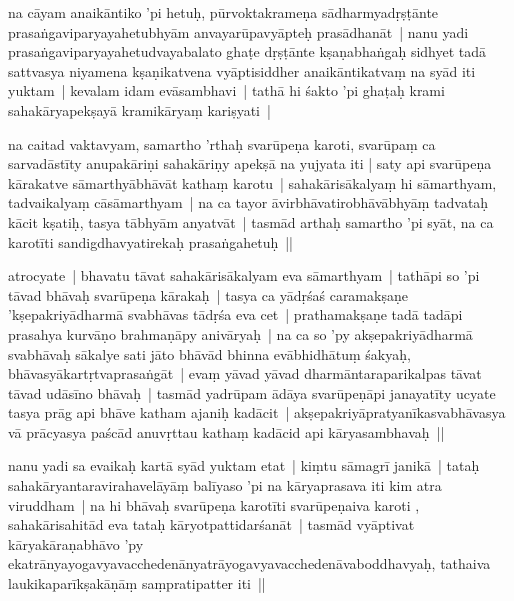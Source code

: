 \documentclass[article,12pt,a4paper]{memoir}%
\newcounter{parCount}
\begin{document}
	  \pstart \leavevmode%
	\label{thakur75-74.16}na cāyam anaikāntiko 'pi hetuḥ, pūrvoktakrameṇa sādharmyadṛṣṭānte prasaṅgaviparyayahetubhyām anvayarūpavyāpteḥ prasādhanāt |\label{thakur75-74.17} nanu yadi prasaṅgaviparyayahetudvayabalato ghaṭe dṛṣṭānte kṣaṇabhaṅgaḥ sidhyet tadā sattvasya niyamena kṣaṇikatvena vyāptisiddher anaikāntikatvaṃ na syād iti yuktam | kevalam idam evāsambhavi | tathā hi śakto 'pi ghaṭaḥ krami sahakāryapekṣayā kramikāryaṃ kariṣyati |
	{}
	\pend%
      

	  \pstart \leavevmode%
	\label{thakur75-74.21}na caitad vaktavyam, samartho 'rthaḥ svarūpeṇa karoti, svarūpaṃ ca sarvadāstīty anupakāriṇi sahakāriṇy apekṣā na yujyata iti | saty api svarūpeṇa kārakatve sāmarthyābhāvāt kathaṃ karotu | sahakārisākalyaṃ hi sāmarthyam, tadvaikalyaṃ cāsāmarthyam | na ca tayor āvirbhāvatirobhāvābhyāṃ tadvataḥ kācit kṣatiḥ, tasya tābhyām anyatvāt | tasmād arthaḥ samartho 'pi syāt, na ca karotīti sandigdhavyatirekaḥ prasaṅgahetuḥ ||
	{}
	\pend%
      

	  \pstart \leavevmode%
	\label{thakur75-74.27}atrocyate | bhavatu tāvat sahakārisākalyam eva sāmarthyam | tathāpi so 'pi tāvad bhāvaḥ svarūpeṇa kārakaḥ |\label{thakur75-74.28} tasya ca yādṛśaś caramakṣaṇe 'kṣepakriyādharmā svabhāvas tādṛśa eva cet | \label{thakur75-74.29} prathamakṣaṇe tadā tadāpi prasahya kurvāṇo brahmaṇāpy anivāryaḥ | na ca so 'py akṣepakriyādharmā svabhāvaḥ sākalye sati jāto bhāvād bhinna evābhidhātuṃ śakyaḥ, bhāvasyākartṛtvaprasaṅgāt | evaṃ yāvad yāvad dharmāntaraparikalpas tāvat tāvad udāsīno bhāvaḥ | \label{thakur75-75.2} tasmād yadrūpam ādāya svarūpeṇāpi janayatīty ucyate tasya prāg api bhāve katham ajaniḥ kadācit | akṣepakriyāpratyanīkasvabhāvasya vā prācyasya paścād anuvṛttau kathaṃ kadācid api kāryasambhavaḥ ||
	{}
	\pend%
      

	  \pstart \leavevmode%
	\label{thakur75-75.5}nanu yadi sa evaikaḥ kartā syād yuktam etat | kiṃtu sāmagrī janikā | tataḥ sahakāryantaravirahavelāyāṃ balīyaso 'pi na kāryaprasava iti kim atra viruddham | na hi bhāvaḥ svarūpeṇa karotīti svarūpeṇaiva karoti , sahakārisahitād eva tataḥ kāryotpattidarśanāt | tasmād vyāptivat kāryakāraṇabhāvo 'py ekatrānyayogavyavacchedenānyatrāyogavyavacchedenāvaboddhavyaḥ, tathaiva laukikaparīkṣakāṇāṃ saṃpratipatter iti ||
	{}
	\pend%
      
\end{document}
